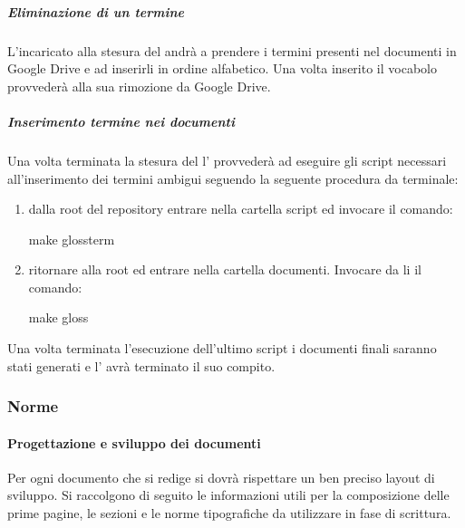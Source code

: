 				\subparagraph{Eliminazione di un termine}
				L'incaricato alla stesura del \docNameVersionGlo{} andrà a prendere i termini presenti nel documenti in Google Drive e ad inserirli in ordine alfabetico. Una volta inserito il vocabolo provvederà alla sua rimozione da Google Drive.
				
				\subparagraph{Inserimento termine nei documenti} %
				\label{subp:inserimento_termine_nei_documenti}
				Una volta terminata la stesura del \docNameVersionGlo{} l'\roleAdministrator{} provvederà ad eseguire gli script necessari all'inserimento dei termini ambigui seguendo la seguente procedura da terminale:
					\begin{enumerate}
						\item dalla root del repository entrare nella cartella script ed invocare il comando:
							\begin{center}
								make glossterm
							\end{center}
						\item ritornare alla root ed entrare nella cartella documenti. Invocare da li il comando:
							\begin{center}
								make gloss
							\end{center}
					\end{enumerate}
				\noindent
				Una volta terminata l'esecuzione dell'ultimo script i documenti finali saranno stati generati e l'\roleAdministrator{} avrà terminato il suo compito.
				


		\subsubsection{Norme}

			\paragraph{Progettazione e sviluppo dei documenti}
			Per ogni documento che si redige si dovrà rispettare un ben preciso layout di sviluppo. Si raccolgono di seguito le informazioni utili per la composizione delle prime pagine, le sezioni e le norme tipografiche da utilizzare in fase di scrittura.

